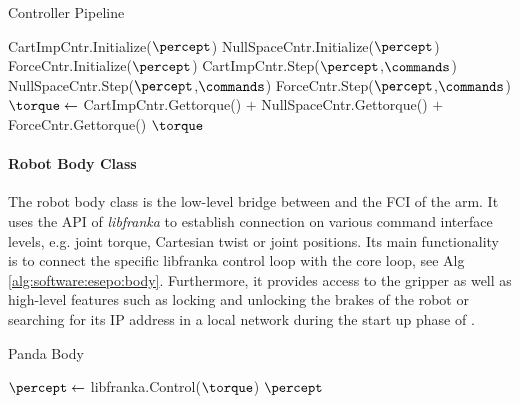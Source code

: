 \begin{algorithm}
\caption{Controller Pipeline}\label{alg:software:esepo:controller}
\begin{algorithmic}[1]
\State CartImpCntr.Initialize($\percept$)
\State NullSpaceCntr.Initialize($\percept$)
\State ForceCntr.Initialize($\percept$)
\EndProcedure
{}
\State CartImpCntr.Step($\percept$,$\commands$)
\State NullSpaceCntr.Step($\percept$,$\commands$)
\State ForceCntr.Step($\percept$,$\commands$)
\State $\torque \gets $ CartImpCntr.Gettorque() $+$ NullSpaceCntr.Gettorque() $+$ ForceCntr.Gettorque()
\Return $\torque$
\EndProcedure
\end{algorithmic}
\end{algorithm}

\paragraph{Robot Body Class}

The robot body class is the low-level bridge between \softwareabbr{} and the FCI of the \platformname{} arm.
It uses the API of \emph{libfranka} to establish connection on various command interface levels, e.g. joint torque, Cartesian twist or joint positions.
Its main functionality is to connect the specific libfranka control loop with the \softwareabbr{} core loop, see Alg \ref{alg:software:esepo:body}.
Furthermore, it provides access to the gripper as well as high-level features such as locking and unlocking the brakes of the robot or searching for its IP address in a local network during the start up phase of \softwareabbr{}.

\begin{algorithm}
\caption{Panda Body}\label{alg:software:esepo:body}
\begin{algorithmic}[1]
\State $\percept \gets $ libfranka.Control($\torque$)
\Return $\percept$
\EndProcedure
\end{algorithmic}
\end{algorithm}